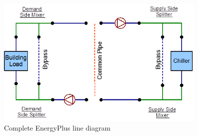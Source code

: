 \begin{figure}[hbtp] %
\centering
\includegraphics[width=0.9\textwidth, height=0.9\textheight, keepaspectratio=true]{media/image010.png}
\caption{Complete EnergyPlus line diagram \protect \label{fig:complete-energyplus-line-diagram}}
\end{figure}
